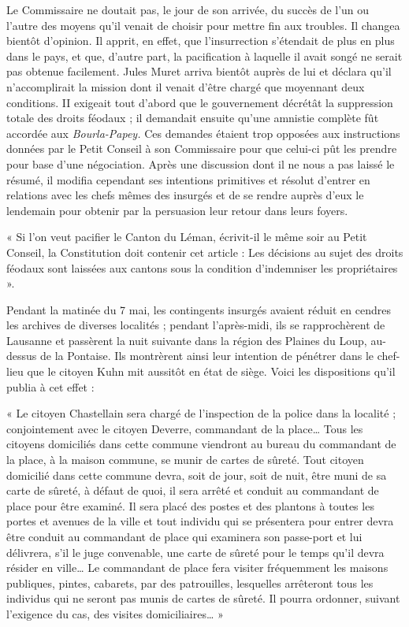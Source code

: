 \documentclass[french,twoside]{book} %
\newenvironment{quoteblock}%
  {\begin{quoting}}
  {\end{quoting}}
\newenvironment{quotebar}{%
    \def\FrameCommand{{\color{rubric!10!}\vrule width 0.5em} \hspace{0.9em}}%
    \def\OuterFrameSep{\itemsep} %
    \MakeFramed {\advance\hsize-\width \FrameRestore}
  }%
  {%
    \endMakeFramed
  }
\renewenvironment{quoteblock}%
  {%
    \savenotes
    \setstretch{0.9}
    \begin{quotebar}
  }
  {%
    \end{quotebar}
    \spewnotes
  }
\begin{document}
Le Commissaire ne doutait pas, le jour de son arrivée, du succès de l’un ou l’autre des moyens qu’il venait de choisir pour mettre fin aux troubles. Il changea bientôt d’opinion. Il apprit, en effet, que l’insurrection s’étendait de plus en plus dans le pays, et que, d’autre part, la pacification à laquelle il avait songé ne serait pas obtenue facilement. Jules Muret arriva bientôt auprès de lui et déclara qu’il n’accomplirait la mission dont il venait d’être chargé que moyennant deux conditions. II exigeait tout d’abord que le gouvernement décrétât la suppression totale des droits féodaux ; il demandait ensuite qu’une amnistie complète fût accordée aux \emph{Bourla-Papey.} Ces demandes étaient trop opposées aux instructions données par le Petit Conseil à son Commissaire pour que celui-ci pût les prendre pour base d’une négociation. Après une discussion dont il ne nous a pas laissé le résumé, il modifia cependant ses intentions primitives et résolut d’entrer en relations avec les chefs mêmes des insurgés et de se rendre auprès d’eux le lendemain pour obtenir par la persuasion leur retour dans leurs foyers.\par

\begin{quoteblock}
 \noindent « Si l’on veut pacifier le Canton du Léman, écrivit-il le même soir au Petit Conseil, la Constitution doit contenir cet article : Les décisions au sujet des droits féodaux sont laissées aux cantons sous la condition d’indemniser les propriétaires ».
 \end{quoteblock}

\noindent Pendant la matinée du 7 mai, les contingents insurgés avaient réduit en cendres les archives de diverses localités ; pendant l’après-midi, ils se rapprochèrent de Lausanne et passèrent la nuit suivante dans la région des Plaines du Loup, au-dessus de la Pontaise. Ils montrèrent ainsi leur intention de pénétrer dans le chef-lieu que le citoyen Kuhn mit aussitôt en état de siège. Voici les dispositions qu’il publia à cet effet :\par

\begin{quoteblock}
 \noindent « Le citoyen Chastellain sera chargé de l’inspection de la police dans la localité ; conjointement avec le citoyen Deverre, commandant de la place… Tous les citoyens domiciliés dans cette commune viendront au bureau du commandant de la place, à la maison commune, se munir de cartes de sûreté. Tout citoyen domicilié dans cette commune devra, soit de jour, soit de nuit, être muni de sa carte de sûreté, à défaut de quoi, il sera arrêté et conduit au commandant de place pour être examiné. Il sera placé des postes et des plantons à toutes les portes et avenues de la ville et tout individu qui se présentera pour entrer devra être conduit au commandant de place qui examinera son passe-port et lui délivrera, s’il le juge convenable, une carte de sûreté pour le temps qu’il devra résider en ville… Le commandant de place fera visiter fréquemment les maisons publiques, pintes, cabarets, par des patrouilles, lesquelles arrêteront tous les individus qui ne seront pas munis de cartes de sûreté. Il pourra ordonner, suivant l’exigence du cas, des visites domiciliaires… »
 \end{quoteblock}
\end{document}
